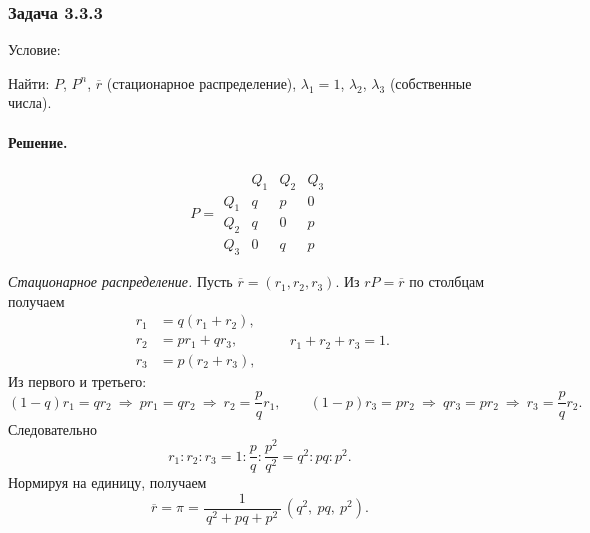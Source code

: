 
\subsubsection*{Задача 3.3.3}

Условие:


Найти: $P$, $P^n$, $\overline{r}$ (стационарное распределение), $\lambda_1=1$, $\lambda_2$, $\lambda_3$ (собственные числа).

\paragraph{Решение.}

\[
	P =
	\begin{array}{c|ccc}
		    & Q_1 & Q_2 & Q_3 \\ \hline
		Q_1 & q   & p   & 0   \\
		Q_2 & q   & 0   & p   \\
		Q_3 & 0   & q   & p
	\end{array}
\]

\emph{Стационарное распределение.} Пусть $\overline r=(r_1,r_2,r_3)$.
Из $rP=\overline r$ по столбцам получаем
\[
	\begin{aligned}
		r_1 & = q(r_1+r_2),    \\
		r_2 & = p r_1 + q r_3, \\
		r_3 & = p(r_2+r_3),
	\end{aligned}
	\qquad r_1+r_2+r_3=1.
\]
Из первого и третьего:
\[
	(1-q)r_1=q r_2 \ \Rightarrow\ p r_1=q r_2 \ \Rightarrow\ r_2=\frac{p}{q}r_1,
	\qquad
	(1-p)r_3=p r_2 \ \Rightarrow\ q r_3=p r_2 \ \Rightarrow\ r_3=\frac{p}{q}r_2.
\]
Следовательно
\[
	r_1:r_2:r_3 = 1 : \frac{p}{q} : \frac{p^2}{q^2} = q^2 : pq : p^2.
\]
Нормируя на единицу, получаем
\[
	\overline r=\pi=
	\frac{1}{\,q^2+pq+p^2\,}\,(q^2,\ pq,\ p^2).
\]

